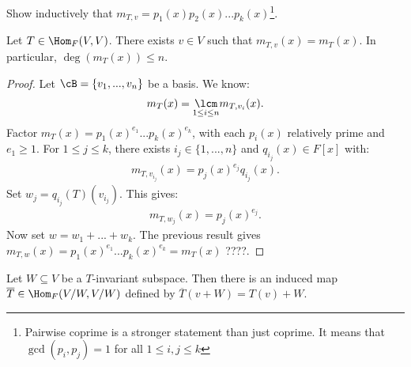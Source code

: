     \begin{exercise}
        Show inductively that $m_{T,v} = p_1(x)p_2(x)...p_k(x)$\footnote{Pairwise coprime is a stronger statement than just coprime. It means that $\gcd(p_i,p_j) = 1$ for all $1\leq i,j \leq k$}.
    \end{exercise}

    \begin{theorem}
        Let $T \in \Hom_F(V,V)$. There exists $v \in V$ such that $m_{T,v}(x) = m_T(x)$. In particular, $\deg(m_T(x)) \leq n$.
    \end{theorem}
        \begin{proof}
            Let $\cB = \{v_1,...,v_n\}$ be a basis. We know:
            \begin{equation*}
                \begin{split}
                    m_T(x) = \underset{1 \leq i \leq n}\lcm m_{T,v_i}(x).
                \end{split}
                \end{equation*}
            Factor $m_T(x) = p_1(x)^{e_1}...p_k(x)^{e_k}$, with each $p_i(x)$ relatively prime and $e_1 \geq 1$. For $1 \leq j \leq k$, there exists $i_j \in \{1,...,n\}$ and $q_{i_j}(x) \in F[x]$ with:
                \begin{equation*}
                \begin{split}
                    m_{T,v_{i_j}}(x) = p_j(x)^{e_j}q_{i_j}(x).
                \end{split}
                \end{equation*}
            Set $w_j = q_{i_j}(T)(v_{i_j})$. This gives:
                \begin{equation*}
                \begin{split}
                    m_{T,w_j}(x) = p_j(x)^{e_j}.
                \end{split}
                \end{equation*}
            Now set $w = w_1 + ... + w_k$. The previous result gives $m_{T,w}(x) = p_1(x)^{e_1}...p_k(x)^{e_k} = m_T(x)${\color{red} ????}.
        \end{proof}
    
    \begin{lemma}
        Let $W \subseteq V$ be a $T$-invariant subspace. Then there is an induced map $\overline{T} \in \Hom_F(V/W,V/W)$ defined by $\overline{T}(v+W) = T(v)+W$.
    \end{lemma}

